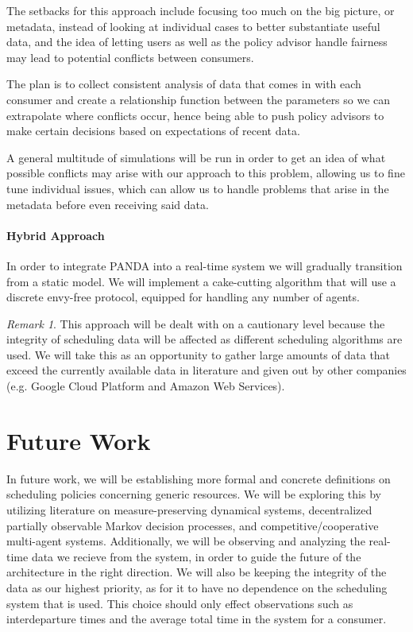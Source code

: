 \documentclass{article}
\theoremstyle{definition}
\theoremstyle{remark}
\newtheorem*{remark}{Remark}
\begin{document}
		The setbacks for this approach include focusing too much on the big picture, or metadata, instead of looking at individual cases to better substantiate useful data, and the idea of letting users as well as the policy advisor handle fairness may lead to potential conflicts between consumers.
		
		The plan is to collect consistent analysis of data that comes in with each consumer and create a relationship function between the parameters so we can extrapolate where conflicts occur, hence being able to push policy advisors to make certain decisions based on expectations of recent data.
		
		A general multitude of simulations will be run in order to get an idea of what possible conflicts may arise with our approach to this problem, allowing us to fine tune individual issues, which can allow us to handle problems that arise in the metadata before even receiving said data.

		\paragraph{Hybrid Approach} 
		
		In order to integrate PANDA into a real-time system we will gradually transition from a static model. We will implement a cake-cutting algorithm that will use a discrete envy-free protocol, equipped for handling any number of agents. 
		
		\begin{remark}
			This approach will be dealt with on a cautionary level because the integrity of scheduling data will be affected as different scheduling algorithms are used. We will take this as an opportunity to gather large amounts of data that exceed the currently available data in literature and given out by other companies (e.g. Google Cloud Platform and Amazon Web Services).
		\end{remark}
	
	\section{Future Work}
	
	In future work, we will be establishing more formal and concrete definitions on scheduling policies concerning generic resources. We will be exploring this by utilizing literature on measure-preserving dynamical systems, decentralized partially observable Markov decision processes, and competitive/cooperative multi-agent systems. Additionally, we will be observing and analyzing the real-time data we recieve from the system, in order to guide the future of the architecture in the right direction. We will also be keeping the integrity of the data as our highest priority, as for it to have no dependence on the scheduling system that is used. This choice should only effect observations such as interdeparture times and the average total time in the system for a consumer.

	\newpage
	
	\cite{carastan2017obtaining}

	\printbibliography
\end{document}
